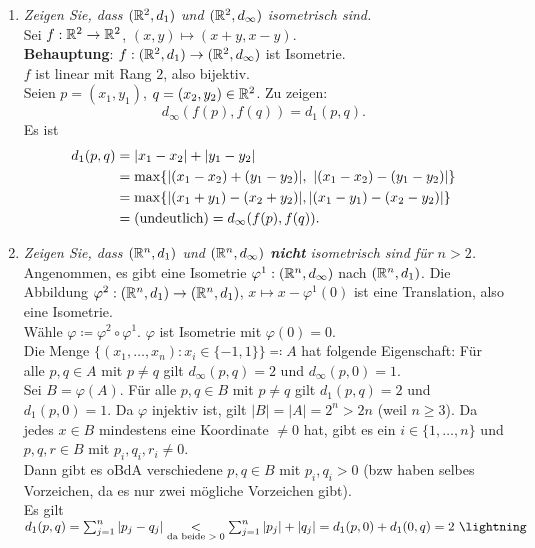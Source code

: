\begin{problem*}[4]
  \begin{enumerate}
    \item \emph{Zeigen Sie, dass $ (\mathbb{R}^2, d_1) $ und $ (\mathbb{R}^2, d_\infty) $ isometrisch sind.} \\
      Sei $ f : \mathbb{R}^2 \to \mathbb{R}^2 $, $ (x,y) \mapsto (x+y, x-y) $. \\
      \textbf{Behauptung}: $ f : (\mathbb{R}^2, d_1) \to (\mathbb{R}^2, d_\infty) $ ist Isometrie. \\
      $ f $ ist linear mit Rang $ 2 $, also bijektiv. \\
      Seien $ p = (x_1, y_1) $, $ q = (x_2, y_2) \in \mathbb{R}^2 $. Zu zeigen:
      \begin{equation*}
        d_\infty(f(p),f(q)) = d_1(p,q)\text{.}
      \end{equation*}
      Es ist
      \begin{align*}
        d_1(p,q) &= \vert x_1 - x_2 \vert + \vert y_1 - y_2 \vert \\
          &= \max\{ \vert (x_1-x_2) + (y_1-y_2) \vert, \ \vert (x_1 - x_2) - (y_1-y_2) \vert \} \\
          &= \max\{ \vert (x_1 + y_1) - (x_2+y_2) \vert, \vert (x_1-y_1)-(x_2-y_2) \vert \} \\
          &= \text{(undeutlich)} = d_\infty(f(p),f(q))\text{.} \quad \qed
      \end{align*}
    \item \emph{Zeigen Sie, dass $ (\mathbb{R}^n, d_1) $ und $ (\mathbb{R}^n, d_\infty) $ \textbf{nicht} isometrisch sind für $ n > 2 $.} \\
    Angenommen, es gibt eine Isometrie $ \varphi^1: (\mathbb{R}^n, d_\infty) $ nach $ (\mathbb{R}^n, d_1) $. Die Abbildung $ \varphi^2 : (\mathbb{R}^n, d_1) \to (\mathbb{R}^n, d_1) $, $ x \mapsto x - \varphi^1(0) $ ist eine Translation, also eine Isometrie. \\
    Wähle $ \varphi \coloneqq \varphi^2 \circ \varphi^1 $. $ \varphi $ ist Isometrie mit $ \varphi(0) = 0 $. \\
    Die Menge $ \{ (x_1, \dots, x_n) : x_i \in \{ -1, 1 \} \} \eqqcolon A $ hat folgende Eigenschaft: Für alle $ p, q \in A $ mit $ p \neq q $ gilt $ d_\infty(p,q) = 2 $ und $ d_\infty(p, 0) = 1 $. \\
    Sei $ B = \varphi(A) $. Für alle $ p,q \in B $ mit $ p \neq q $ gilt $ d_1(p,q) = 2 $ und $ d_1(p,0) = 1 $. Da $ \varphi $ injektiv ist, gilt $ \vert B \vert = \vert A \vert = 2^n > 2n $ (weil $ n \geq 3 $). Da jedes $ x \in B $ mindestens eine Koordinate $ \neq 0 $ hat, gibt es ein $ i \in \{ 1, \dots, n \} $ und $ p,q,r \in B $ mit $ p_i, q_i, r_i \neq 0 $. \\
    Dann gibt es oBdA verschiedene $ p,q \in B $ mit $ p_i, q_i > 0 $ (bzw haben selbes Vorzeichen, da es nur zwei mögliche Vorzeichen gibt). \\
    Es gilt $ d_1(p,q) = \sum_{j = 1}^n \vert p_j - q_j \vert \underset{\text{da beide $ > 0 $}}{<} \sum_{j = 1}^n \vert p_j \vert + \vert q_j \vert = d_1(p,0) + d_1(0,q) = 2 \ \lightning $
  \end{enumerate}
\end{problem*}


